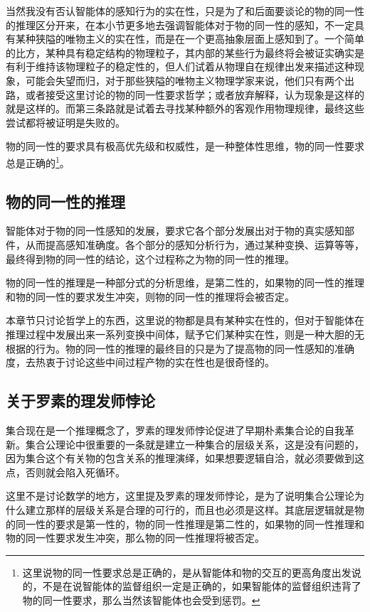 \documentclass[12pt,oneside]{book}
\begin{document}
当然我没有否认智能体的感知行为的实在性，只是为了和后面要谈论的物的同一性的推理区分开来，在本小节更多地去强调智能体对于物的同一性的感知，不一定具有某种狭隘的唯物主义的实在性，而是在一个更高抽象层面上感知到了。一个简单的比方，某种具有稳定结构的物理粒子，其内部的某些行为最终将会被证实确实是有利于维持该物理粒子的稳定性的，但人们试着从物理自在规律出发来描述这种现象，可能会失望而归，对于那些狭隘的唯物主义物理学家来说，他们只有两个出路，或者接受这里讨论的物的同一性要求哲学；或者放弃解释，认为现象是这样的就是这样的。而第三条路就是试着去寻找某种额外的客观作用物理规律，最终这些尝试都将被证明是失败的。

物的同一性的要求具有极高优先级和权威性，是一种整体性思维，物的同一性要求总是正确的\footnote{这里说物的同一性要求总是正确的，是从智能体和物的交互的更高角度出发说的，不是在说智能体的监督组织一定是正确的，如果智能体的监督组织违背了物的同一性要求，那么当然该智能体也会受到惩罚。}。


\subsection{物的同一性的推理}
智能体对于物的同一性感知的发展，要求它各个部分发展出对于物的真实感知部件，从而提高感知准确度。各个部分的感知分析行为，通过某种变换、运算等等，最终得到物的同一性的结论，这个过程称之为物的同一性的推理。

物的同一性的推理是一种部分式的分析思维，是第二性的，如果物的同一性的推理和物的同一性的要求发生冲突，则物的同一性的推理将会被否定。

本章节只讨论哲学上的东西，这里说的物都是具有某种实在性的，但对于智能体在推理过程中发展出来一系列变换中间体，赋予它们某种实在性，则是一种大胆的无根据的行为。物的同一性的推理的最终目的只是为了提高物的同一性感知的准确度，去热衷于讨论这些中间过程产物的实在性也是很奇怪的。

\subsection{关于罗素的理发师悖论}
集合现在是一个推理概念了，罗素的理发师悖论促进了早期朴素集合论的自我革新。集合公理论中很重要的一条就是建立一种集合的层级关系，这是没有问题的，因为集合这个有关物的包含关系的推理演绎，如果想要逻辑自洽，就必须要做到这点，否则就会陷入死循环。

这里不是讨论数学的地方，这里提及罗素的理发师悖论，是为了说明集合公理论为什么建立那样的层级关系是合理的可行的，而且也必须是这样。其底层逻辑就是物的同一性的要求是第一性的，物的同一性推理是第二性的，如果物的同一性推理和物的同一性要求发生冲突，那么物的同一性推理将被否定。
\end{document}
